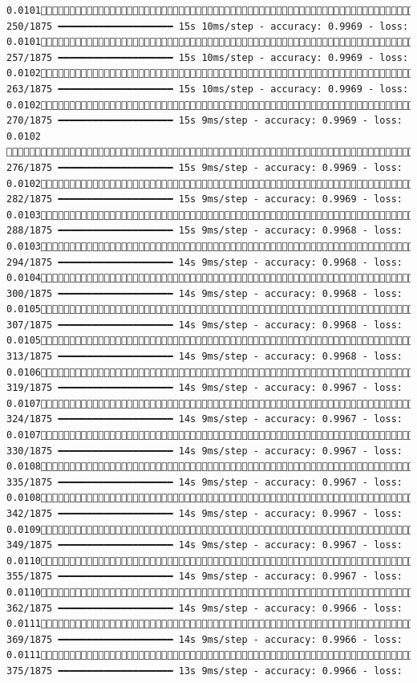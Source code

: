 \documentclass[
  letterpaper,
  DIV=11,
  numbers=noendperiod]{scrreprt}
\begin{document}
\begin{verbatim}
0.0101 250/1875 ━━━━━━━━━━━━━━━━━━━━ 15s 10ms/step - accuracy: 0.9969 - loss: 0.0101 257/1875 ━━━━━━━━━━━━━━━━━━━━ 15s 10ms/step - accuracy: 0.9969 - loss: 0.0102 263/1875 ━━━━━━━━━━━━━━━━━━━━ 15s 10ms/step - accuracy: 0.9969 - loss: 0.0102 270/1875 ━━━━━━━━━━━━━━━━━━━━ 15s 9ms/step - accuracy: 0.9969 - loss: 0.0102  276/1875 ━━━━━━━━━━━━━━━━━━━━ 15s 9ms/step - accuracy: 0.9969 - loss: 0.0102 282/1875 ━━━━━━━━━━━━━━━━━━━━ 15s 9ms/step - accuracy: 0.9969 - loss: 0.0103 288/1875 ━━━━━━━━━━━━━━━━━━━━ 15s 9ms/step - accuracy: 0.9968 - loss: 0.0103 294/1875 ━━━━━━━━━━━━━━━━━━━━ 14s 9ms/step - accuracy: 0.9968 - loss: 0.0104 300/1875 ━━━━━━━━━━━━━━━━━━━━ 14s 9ms/step - accuracy: 0.9968 - loss: 0.0105 307/1875 ━━━━━━━━━━━━━━━━━━━━ 14s 9ms/step - accuracy: 0.9968 - loss: 0.0105 313/1875 ━━━━━━━━━━━━━━━━━━━━ 14s 9ms/step - accuracy: 0.9968 - loss: 0.0106 319/1875 ━━━━━━━━━━━━━━━━━━━━ 14s 9ms/step - accuracy: 0.9967 - loss: 0.0107 324/1875 ━━━━━━━━━━━━━━━━━━━━ 14s 9ms/step - accuracy: 0.9967 - loss: 0.0107 330/1875 ━━━━━━━━━━━━━━━━━━━━ 14s 9ms/step - accuracy: 0.9967 - loss: 0.0108 335/1875 ━━━━━━━━━━━━━━━━━━━━ 14s 9ms/step - accuracy: 0.9967 - loss: 0.0108 342/1875 ━━━━━━━━━━━━━━━━━━━━ 14s 9ms/step - accuracy: 0.9967 - loss: 0.0109 349/1875 ━━━━━━━━━━━━━━━━━━━━ 14s 9ms/step - accuracy: 0.9967 - loss: 0.0110 355/1875 ━━━━━━━━━━━━━━━━━━━━ 14s 9ms/step - accuracy: 0.9967 - loss: 0.0110 362/1875 ━━━━━━━━━━━━━━━━━━━━ 14s 9ms/step - accuracy: 0.9966 - loss: 0.0111 369/1875 ━━━━━━━━━━━━━━━━━━━━ 14s 9ms/step - accuracy: 0.9966 - loss: 0.0111 375/1875 ━━━━━━━━━━━━━━━━━━━━ 13s 9ms/step - accuracy: 0.9966 - loss: 
\end{verbatim}
\end{document}
